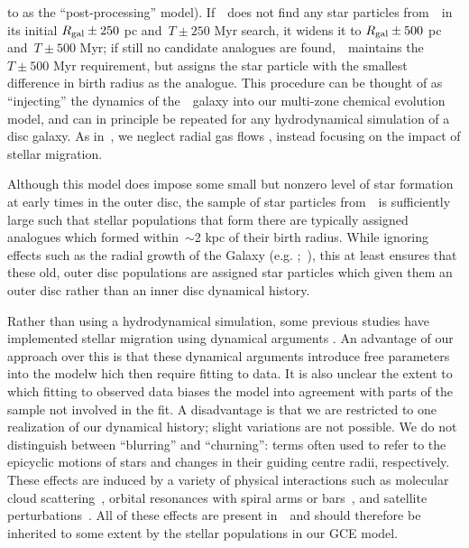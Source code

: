 \documentclass[ms.tex]{subfiles}
\begin{document}
to as the ``post-processing'' model).
If~\vice~does not find any star particles from~\hsim~in its initial
$R_\text{gal} \pm 250$ pc and~$T \pm 250$ Myr search, it widens it to
$R_\text{gal} \pm 500$ pc and~$T \pm 500$ Myr; if still no candidate analogues are
found,~\vice~maintains the~$T \pm 500$ Myr requirement, but assigns the star
particle with the smallest difference in birth radius as the analogue.
This procedure can be thought of as ``injecting'' the dynamics of
the~\hsim~galaxy into our multi-zone chemical evolution model, and can in
principle be repeated for any hydrodynamical simulation of a disc galaxy.
As in~\citet{Johnson2021}, we neglect radial gas flows
\citep[e.g.][]{Lacey1985, Bilitewski2012, Vincenzo2020}, instead focusing on
the impact of stellar migration.
\par
Although this model does impose some small but nonzero level of star formation
at early times in the outer disc, the sample of star particles from~\hsim~is
sufficiently large such that stellar populations that form there are typically
assigned analogues which formed within~$\sim$2 kpc of their birth radius.
While ignoring effects such as the radial growth of the Galaxy (e.g.
\citealp*{Bird2012};~\citealp{Bird2013}), this at least ensures that these old,
outer disc populations are assigned star particles which given them an outer
disc rather than an inner disc dynamical history.
\par
Rather than using a hydrodynamical simulation, some previous studies have
implemented stellar migration using dynamical arguments
\citep[e.g.][]{Schoenrich2009, Sharma2020}.
An advantage of our approach over this is that these dynamical arguments
introduce free parameters into the modelw hich then require fitting to data.
It is also unclear the extent to which fitting to observed data biases the
model into agreement with parts of the sample not involved in the fit.
A disadvantage is that we are restricted to one realization of our dynamical
history; slight variations are not possible.
We do not distinguish between ``blurring'' and ``churning'': terms often used
to refer to the epicyclic motions of stars and changes in their guiding centre
radii, respectively.
These effects are induced by a variety of physical interactions such as
molecular cloud scattering~\citep{Mihalas1981, Jenkins1990, Jenkins1992},
orbital resonances with spiral arms or bars~\citep{Sellwood2002, Minchev2011},
and satellite perturbations~\citep{Bird2012}.
All of these effects are present in~\hsim~and should therefore be inherited to
some extent by the stellar populations in our GCE model.
\end{document}
